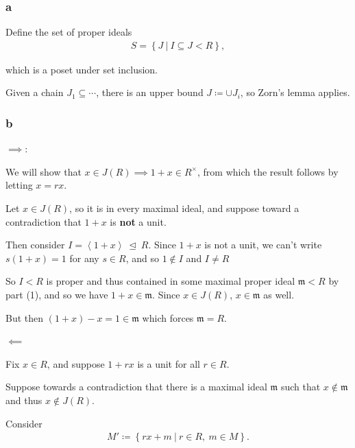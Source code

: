 \begin{solution}

\hypertarget{a-36}{%
\subsubsection{a}\label{a-36}}

Define the set of proper ideals
\begin{align*}
S = \left\{{J {~\mathrel{\Big|}~}I   \subseteq J < R}\right\}
,\end{align*}

which is a poset under set inclusion.

Given a chain \(J_1 \subseteq \cdots\), there is an upper bound
\(J \coloneqq\cup J_i\), so Zorn's lemma applies.

\hypertarget{b-26}{%
\subsubsection{b}\label{b-26}}

\(\implies\):

We will show that \(x\in J(R) \implies 1+x \in R^{\times}\), from which
the result follows by letting \(x=rx\).

Let \(x\in J(R)\), so it is in every maximal ideal, and suppose toward a
contradiction that \(1+x\) is \textbf{not} a unit.

Then consider
\(I = \left\langle{1+x}\right\rangle {~\trianglelefteq~}R\). Since
\(1+x\) is not a unit, we can't write \(s(1+x) = 1\) for any \(s\in R\),
and so \(1 \not\in I\) and \(I\neq R\)

So \(I < R\) is proper and thus contained in some maximal proper ideal
\(\mathfrak{m} < R\) by part (1), and so we have
\(1+x \in \mathfrak{m}\). Since \(x\in J(R)\), \(x\in \mathfrak{m}\) as
well.

But then \((1+x) - x = 1 \in \mathfrak{m}\) which forces
\(\mathfrak{m} = R\).

\(\impliedby\)

Fix \(x\in R\), and suppose \(1+rx\) is a unit for all \(r\in R\).

Suppose towards a contradiction that there is a maximal ideal
\(\mathfrak{m}\) such that \(x\not \in \mathfrak{m}\) and thus
\(x\not\in J(R)\).

Consider
\begin{align*}
M' \coloneqq\left\{{rx + m {~\mathrel{\Big|}~}r\in R,~ m\in M}\right\}
.\end{align*}


\end{solution}
